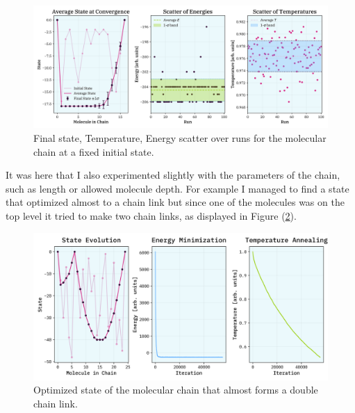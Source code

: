 \documentclass[10pt, titlepage, a4paper]{article}
\begin{document}
\begin{figure}
    \centering
    \includegraphics[width=.95\textwidth]{../fixed-init-multiple.png}
    \caption{Final state, Temperature, Energy scatter over runs for the molecular chain at a fixed initial state.}
    \label{fig:molecular-demo}
\end{figure}

It was here that I also experimented slightly with the parameters of the chain, such as length or allowed molecule depth.
For example I managed to find a state that optimized almost to a chain link but since one of the molecules was on the top level it tried to make 
two chain links, as displayed in Figure (\ref{fig:chain-link}). 

\begin{figure}
    \centering
    \includegraphics[width=.95\textwidth]{../accidental-veriznica.png}
    \caption{Optimized state of the molecular chain that almost forms a double chain link.}
    \label{fig:chain-link}
\end{figure}
\end{document}
